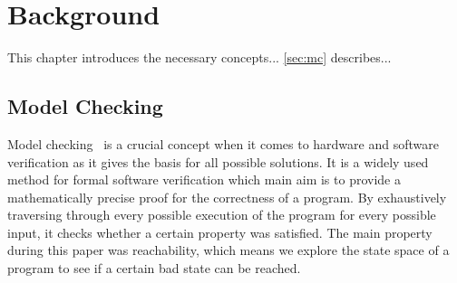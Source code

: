 \chapter{Background}

This chapter introduces the necessary concepts... %
\autoref{sec:mc} describes... %


\section{Model Checking}\label{sec:mc}




Model checking~\cite{modelChecking} is a crucial concept when it comes to hardware and software verification as it gives the basis for all possible solutions. %
It is a widely used method for formal software verification  which main aim is to provide a mathematically precise proof for the correctness of a program. %
By exhaustively traversing through every possible execution of the program for every possible input, it checks whether a certain property was satisfied. %
The main property during this paper was reachability, which means we explore the state space of a program to see if a certain bad state can be reached.

